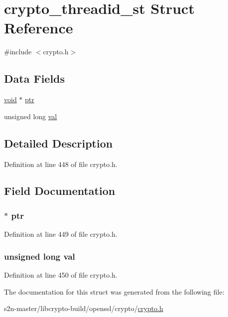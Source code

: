 \hypertarget{structcrypto__threadid__st}{}\section{crypto\+\_\+threadid\+\_\+st Struct Reference}
\label{structcrypto__threadid__st}


{\ttfamily \#include $<$crypto.\+h$>$}

\subsection*{Data Fields}
\begin{DoxyCompactItemize}
\item 
\hyperlink{hw__4758__cca_8h_afad4d591c7931ff6dc5bf69c76c96aa0}{void} $\ast$ \hyperlink{structcrypto__threadid__st_aaf0497a3bd20a0066017546af6bf80be}{ptr}
\item 
unsigned long \hyperlink{structcrypto__threadid__st_a584eca781df5f1fd17067ec7a5489192}{val}
\end{DoxyCompactItemize}


\subsection{Detailed Description}


Definition at line 448 of file crypto.\+h.



\subsection{Field Documentation}
\subsubsection[{\texorpdfstring{ptr}{ptr}}]{ $\ast$ ptr}\hypertarget{structcrypto__threadid__st_aaf0497a3bd20a0066017546af6bf80be}{}\label{structcrypto__threadid__st_aaf0497a3bd20a0066017546af6bf80be}


Definition at line 449 of file crypto.\+h.

\subsubsection[{\texorpdfstring{val}{val}}]{\setlength{\rightskip}{0pt plus 5cm}unsigned long val}\hypertarget{structcrypto__threadid__st_a584eca781df5f1fd17067ec7a5489192}{}\label{structcrypto__threadid__st_a584eca781df5f1fd17067ec7a5489192}


Definition at line 450 of file crypto.\+h.



The documentation for this struct was generated from the following file\+:\begin{DoxyCompactItemize}
\item 
s2n-\/master/libcrypto-\/build/openssl/crypto/\hyperlink{crypto_2crypto_8h}{crypto.\+h}\end{DoxyCompactItemize}
